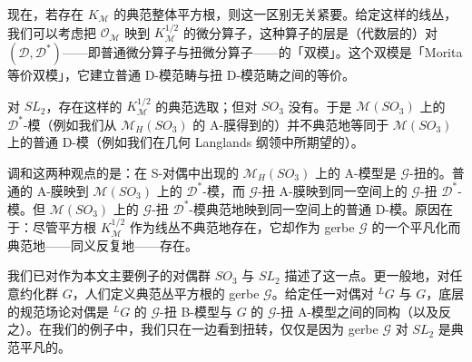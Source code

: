 \documentclass[11pt,a4paper]{article}
\newcommand{\CD}{\mathcal{D}}
\begin{document}
现在，若存在 $K_{\mathcal{M}}$ 的典范整体平方根，则这一区别无关紧要。给定这样的线丛，我们可以考虑把 $\mathcal{O}_{\mathcal{M}}$ 映到 $K_{\mathcal{M}}^{1/2}$ 的微分算子，这种算子的层是（代数层的）对 $(\CD,\CD^*)$——即普通微分算子与扭微分算子——的「双模」。这个双模是「Morita 等价双模」，它建立普通 D-模范畴与扭 D-模范畴之间的等价。

对 $SL_2$，存在这样的 $K_{\mathcal{M}}^{1/2}$ 的典范选取；但对 $SO_3$ 没有。于是 $\mathcal{M}(SO_3)$ 上的 $\CD^*$-模（例如我们从 $\mathcal{M}_H(SO_3)$ 的 A-膜得到的）并不典范地等同于 $\mathcal{M}(SO_3)$ 上的普通 D-模（例如我们在几何 Langlands 纲领中所期望的）。

调和这两种观点的是：在 S-对偶中出现的 $\mathcal{M}_H(SO_3)$ 上的 A-模型是 $\mathcal{G}$-扭的。普通的 A-膜映到 $\mathcal{M}(SO_3)$ 上的 $\CD^*$-模，而 $\mathcal{G}$-扭 A-膜映到同一空间上的 $\mathcal{G}$-扭 $\CD^*$-模。但 $\mathcal{M}(SO_3)$ 上的 $\mathcal{G}$-扭 $\CD^*$-模典范地映到同一空间上的普通 D-模。原因在于：尽管平方根 $K_{\mathcal{M}}^{1/2}$ 作为线丛不典范地存在，它却作为 gerbe $\mathcal{G}$ 的一个平凡化而典范地——同义反复地——存在。


我们已对作为本文主要例子的对偶群 $SO_3$ 与 $SL_2$ 描述了这一点。更一般地，对任意约化群 $G$，人们定义典范丛平方根的 gerbe $\mathcal{G}$。给定任一对偶对 ${}^{L}G$ 与 $G$，底层的规范场论对偶是 ${}^{L}G$ 的 $\mathcal{G}$-扭 B-模型与 $G$ 的 $\mathcal{G}$-扭 A-模型之间的同构（以及反之）。在我们的例子中，我们只在一边看到扭转，仅仅是因为 gerbe $\mathcal{G}$ 对 $SL_2$ 是典范平凡的。



\end{document}
